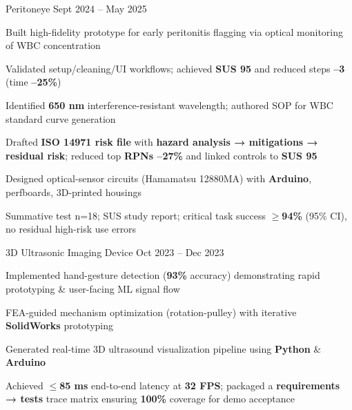 \documentclass[11pt, a4paper]{russell}
\begin{document}
\begin{cventries}
\cvproject
  {Peritoneye} %
  {Sept 2024 -- May 2025} %
  {
    \begin{cvitems}
        \item {Built high-fidelity prototype for early peritonitis flagging via optical monitoring of WBC concentration}
  \item {Validated setup/cleaning/UI workflows; achieved \textbf{SUS 95} and reduced steps \textbf{--3} (time \textbf{--25\%})}
        \item {Identified \textbf{650 nm} interference-resistant wavelength; authored SOP for WBC standard curve generation}
  \item {Drafted \textbf{ISO 14971 risk file} with \textbf{hazard analysis → mitigations → residual risk}; reduced top \textbf{RPNs --27\%} and linked controls to \textbf{SUS 95}}
        \item {Designed optical-sensor circuits (Hamamatsu 12880MA) with \textbf{Arduino}, perfboards, 3D-printed housings}
  \item {Summative test n=18; SUS study report; critical task success \textbf{\ensuremath{\geq}94\%} (95\% CI), no residual high-risk use errors}
    \end{cvitems}
  }
\cvproject
  {3D Ultrasonic Imaging Device} %
  {Oct 2023 -- Dec 2023} %
  {
    \begin{cvitems}
        \item {Implemented hand-gesture detection (\textbf{93\%} accuracy) demonstrating rapid prototyping \& user-facing ML signal flow}
        \item {FEA-guided mechanism optimization (rotation-pulley) with iterative \textbf{SolidWorks} prototyping}
        \item {Generated real-time 3D ultrasound visualization pipeline using \textbf{Python} \& \textbf{Arduino}}
  \item {Achieved \textbf{\ensuremath{\leq}85 ms} end-to-end latency at \textbf{32 FPS}; packaged a \textbf{requirements → tests} trace matrix ensuring \textbf{100\%} coverage for demo acceptance}
    \end{cvitems}
  }
\end{cventries}

\begin{cvskills}
\end{cvskills}

\vspace*{\fill}
\end{document}
